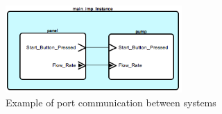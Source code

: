 \begin{figure}[ht]%
    \begin{center}
    	\includegraphics[width=0.6\textwidth]{figures/port-communication.png}    	
    \end{center}
    \caption{Example of port communication between systems}
    \label{figure:port_communication}
\end{figure}

